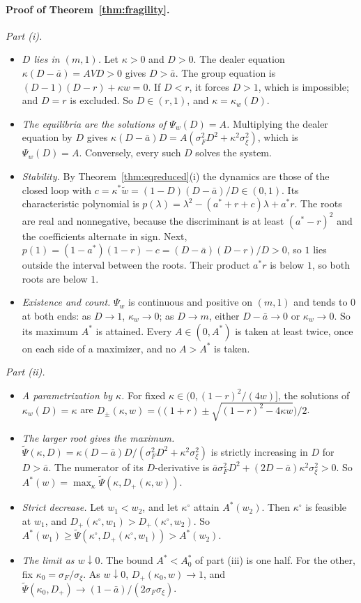 \documentclass[12pt]{article}
\theoremstyle{definition}
\theoremstyle{remark}
\begin{document}
\paragraph{Proof of Theorem~\ref{thm:fragility}.}
\emph{Part (i).}
\begin{itemize}[itemsep=1pt,topsep=2pt]
\item \emph{$D$ lies in $(m,1)$.} Let $\kappa>0$ and $D>0$. The dealer equation $\kappa(D-\bar a)=AVD>0$ gives $D>\bar a$. The group equation is $(D-1)(D-r)+\kappa w=0$. If $D<r$, it forces $D>1$, which is impossible; and $D=r$ is excluded. So $D\in(r,1)$, and $\kappa=\kappa_w(D)$.
\item \emph{The equilibria are the solutions of $\Psi_w(D)=A$.} Multiplying the dealer equation by $D$ gives $\kappa(D-\bar a)D=A(\sigma_F^2D^2+\kappa^2\sigma_\xi^2)$, which is $\Psi_w(D)=A$. Conversely, every such $D$ solves the system.
\item \emph{Stability.} By Theorem~\ref{thm:eqreduced}(i) the dynamics are those of the closed loop with $c=\kappa^*\tilde w=(1-D)(D-\bar a)/D\in(0,1)$. Its characteristic polynomial is $p(\lambda)=\lambda^2-(a^*+r+c)\lambda+a^*r$. The roots are real and nonnegative, because the discriminant is at least $(a^*-r)^2$ and the coefficients alternate in sign. Next, $p(1)=(1-a^*)(1-r)-c=(D-\bar a)(D-r)/D>0$, so $1$ lies outside the interval between the roots. Their product $a^*r$ is below $1$, so both roots are below $1$.
\item \emph{Existence and count.} $\Psi_w$ is continuous and positive on $(m,1)$ and tends to $0$ at both ends: as $D\to1$, $\kappa_w\to0$; as $D\to m$, either $D-\bar a\to0$ or $\kappa_w\to0$. So its maximum $A^*$ is attained. Every $A\in(0,A^*)$ is taken at least twice, once on each side of a maximizer, and no $A>A^*$ is taken.
\end{itemize}

\emph{Part (ii).}
\begin{itemize}[itemsep=1pt,topsep=2pt]
\item \emph{A parametrization by $\kappa$.} For fixed $\kappa\in(0,(1-r)^2/(4w)]$, the solutions of $\kappa_w(D)=\kappa$ are $D_\pm(\kappa,w)=\bigl((1+r)\pm\sqrt{(1-r)^2-4\kappa w}\bigr)/2$.
\item \emph{The larger root gives the maximum.} $\tilde\Psi(\kappa,D)=\kappa(D-\bar a)D/(\sigma_F^2D^2+\kappa^2\sigma_\xi^2)$ is strictly increasing in $D$ for $D>\bar a$. The numerator of its $D$-derivative is $\bar a\sigma_F^2D^2+(2D-\bar a)\kappa^2\sigma_\xi^2>0$. So $A^*(w)=\max_\kappa\tilde\Psi(\kappa,D_+(\kappa,w))$.
\item \emph{Strict decrease.} Let $w_1<w_2$, and let $\kappa^\circ$ attain $A^*(w_2)$. Then $\kappa^\circ$ is feasible at $w_1$, and $D_+(\kappa^\circ,w_1)>D_+(\kappa^\circ,w_2)$. So $A^*(w_1)\ge\tilde\Psi(\kappa^\circ,D_+(\kappa^\circ,w_1))>A^*(w_2)$.
\item \emph{The limit as $w\downarrow0$.} The bound $A^*<A^*_0$ of part (iii) is one half. For the other, fix $\kappa_0=\sigma_F/\sigma_\xi$. As $w\downarrow0$, $D_+(\kappa_0,w)\to1$, and $\tilde\Psi(\kappa_0,D_+)\to(1-\bar a)/(2\sigma_F\sigma_\xi)$.
\end{itemize}
\end{document}
